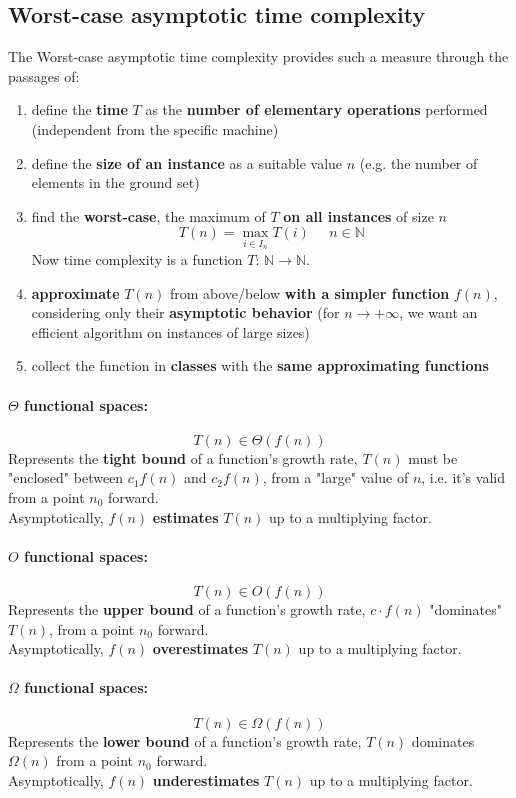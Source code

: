 \documentclass[11pt]{article}
\begin{document}
	\subsection{Worst-case asymptotic time complexity}
	The Worst-case asymptotic time complexity provides such a measure through the passages of:
	\begin{enumerate}
		\item define the \textbf{time} $T$ as the \textbf{number of elementary operations} performed (independent from the specific machine)
		\item define the \textbf{size of an instance} as a suitable value $n$ (e.g. the number of elements in the ground set)
		\item find the \textbf{worst-case}, the maximum of $T$ \textbf{on all instances} of size $n$
		$$ T(n) = \max_{i \in I_n} T(i) \;\;\;\;\; n \in \mathbb{N} $$
		Now time complexity is a function $T : \, \mathbb{N} \rightarrow \mathbb{N}$.
		\item \textbf{approximate} $T(n)$ from above/below \textbf{with a simpler function} $f(n)$, considering only their \textbf{asymptotic behavior} (for $n \rightarrow +\infty$, we want an efficient algorithm on instances of large sizes)
		\item collect the function in \textbf{classes} with the \textbf{same approximating functions}
	\end{enumerate}
	
	\paragraph{$\Theta$ functional spaces:}
	$$ T(n) \in \Theta(f(n))$$
	Represents the \textbf{tight bound} of a function's growth rate, $T(n)$ must be "enclosed" between $c_1 f(n)$ and $c_2 f(n)$, from a "large" value of $n$, i.e. it's valid from a point $n_0$ forward.\\
	Asymptotically, $f (n)$ \textbf{estimates} $T (n)$ up to a multiplying factor.
	
	\paragraph{$O$ functional spaces:}
	$$ T(n) \in O(f(n))$$
	Represents the \textbf{upper bound} of a function's growth rate, $c \cdot f(n)$ "dominates" $T(n)$, from a point $n_0$ forward. \\
	Asymptotically, $f (n)$ \textbf{overestimates} $T (n)$ up to a multiplying factor.
	
	\paragraph{$\Omega$ functional spaces:}
	$$ T(n) \in \Omega(f(n))$$
	Represents the \textbf{lower bound} of a function's growth rate, $T(n)$ dominates $\Omega(n)$ from a point $n_0$ forward. \\
	Asymptotically, $f (n)$ \textbf{underestimates} $T (n)$ up to a multiplying factor.
	
\end{document}
